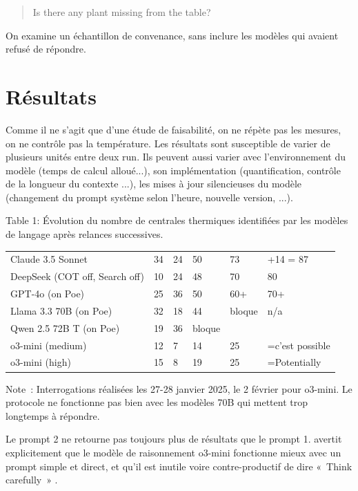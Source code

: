 \documentclass[a4paper,11pt]{report}
\begin{document}
\begin{quote}
Is there any plant missing from the table?
\end{quote}

On examine un échantillon de convenance, sans inclure les modèles qui avaient refusé de répondre.

\section{Résultats}\label{ruxe9sultats}

Comme il ne s'agit que d'une étude de faisabilité, on ne répète pas les mesures, on ne contrôle pas la température. Les résultats sont susceptible de varier de plusieurs unités entre deux run. Ils peuvent aussi varier avec l'environnement du modèle (temps de calcul alloué...), son implémentation (quantification, contrôle de la longueur du contexte ...), les mises à jour silencieuses du modèle (changement du prompt système selon l'heure, nouvelle version, ...).

Table 1: Évolution du nombre de centrales thermiques identifiées par les modèles de langage après relances successives.

\begin{longtable}[]{@{}llllll@{}}
\toprule\noalign{}
& & & & & \\
\midrule\noalign{}
\endhead
\bottomrule\noalign{}
\endlastfoot
Claude 3.5 Sonnet & 34 & 24 & 50 & 73 & +14 = 87 \\
DeepSeek (COT off, Search off) & 10 & 24 & 48 & 70 & 80 \\
GPT-4o (on Poe) & 25 & 36 & 50 & 60+ & 70+ \\
Llama 3.3 70B (on Poe) & 32 & 18 & 44 & bloque & n/a \\
Qwen 2.5 72B T (on Poe) & 19 & 36 & bloque & & \\
o3-mini (medium) & 12 & 7 & 14 & 25 & =c'est possible \\
o3-mini (high) & 15 & 8 & 19 & 25 & =Potentially \\
\end{longtable}

Note~: Interrogations réalisées les 27-28 janvier 2025, le 2 février pour o3-mini. Le protocole ne fonctionne pas bien avec les modèles 70B qui mettent trop longtemps à répondre.

Le prompt 2 ne retourne pas toujours plus de résultats que le prompt 1. \citep{2UNSUP7I} avertit explicitement que le modèle de raisonnement o3-mini fonctionne mieux avec un prompt simple et direct, et qu'il est inutile voire contre-productif de dire «~Think carefully~» .
\end{document}
